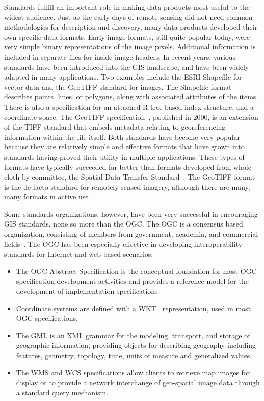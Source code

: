\documentclass{ucdthesis}       %
\begin{document}
Standards fulfill an important role in making data products most
useful to the widest audience.  Just as the early days of remote
sensing did not need common methodologies for description and
discovery, many data products developed their own specific data
formats.  Early image formats, still quite popular today, were very
simple binary representations of the image pixels.  Additional
information is included in separate files for inside image headers.
In recent years, various standards have been introduced into the
\ac{GIS} landscape, and have been widely adapted in many applications.
Two examples include the \ac{ESRI} Shapefile for vector data and the
GeoTIFF standard for images.  The Shapefile
format~\cite{esri97esri-shapef-techn-descr} describes points, lines,
or polygons, along with associated attributes of the items.  There is
also a specification for an attached R-tree based index structure, and
a coordinate space.  The GeoTIFF
specification~\cite{ritter00geotif-format}, published in 2000, is an
extension of the TIFF standard that embeds metadata relating to
georeferencing information within the file itself.  Both standards
have become very popular because they are relatively simple and
effective formats that have grown into standards having proved their
utility in multiple applications.  These types of formats have
typically succeeded far better than formats developed from whole cloth
by committee, the Spatial Data Transfer
Standard~\cite{spatial-data-trans-stand}.  The GeoTIFF format is the
de facto standard for remotely sensed imagery, although there are
many, many formats in active use~\cite{wiki06}.

Some standards organizations, however, have been very successful in
encouraging \ac{GIS} standards, none so more than the \acf{OGC}.  The
\ac{OGC} is a consensus based organization, consisting of members from
government, academia, and commercial
fields~\cite{06open-geosp-consor}.  The \ac{OGC} has been especially
effective in developing interoperability standards for Internet and
web-based scenarios:

\begin{itemize}
\item The \ac{OGC} Abstract Specification is the conceptual foundation for
most \ac{OGC} specification development activities and provides a
reference model for the development of implementation specifications.

\item Coordinate systems are defined with a
\acf{WKT}~\cite{whites01defin-data} representation, used in most
\ac{OGC} specifications.

\item The \acf{GML} is an \ac{XML} grammar for the modeling, transport, and
storage of geographic information, providing objects for describing
geography including features, geometry, topology, time, units of
measure and generalized values.

\item The \acf{WMS} and \acf{WCS} specifications allow clients to retrieve
map images for display or to provide a network interchange of
geo-spatial image data through a standard query mechanism.

\end{itemize}
\end{document}
